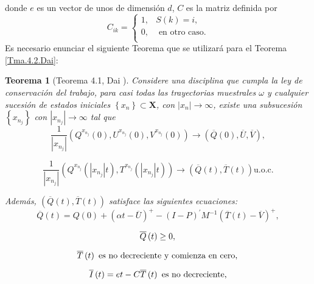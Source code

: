 \documentclass{article}
\newtheorem{Teo}{Teorema}
\begin{document}
donde $e$ es un vector de unos de dimensi\'on $d$, $C$ es la
matriz definida por
\[C_{ik}=\left\{\begin{array}{cc}
1,& S\left(k\right)=i,\\
0,& \textrm{ en otro caso}.\\
\end{array}\right.
\]
Es necesario enunciar el siguiente Teorema que se utilizar\'a para
el Teorema \ref{Tma.4.2.Dai}:
\begin{Teo}[Teorema 4.1, Dai \cite{Dai}]
Considere una disciplina que cumpla la ley de conservaci\'on del
trabajo, para casi todas las trayectorias muestrales $\omega$ y
cualquier sucesi\'on de estados iniciales
$\left\{x_{n}\right\}\subset \mathbf{X}$, con
$|x_{n}|\rightarrow\infty$, existe una subsucesi\'on
$\left\{x_{n_{j}}\right\}$ con $|x_{n_{j}}|\rightarrow\infty$ tal
que
\begin{equation}\label{Eq.4.15}
\frac{1}{|x_{n_{j}}|}\left(Q^{x_{n_{j}}}\left(0\right),U^{x_{n_{j}}}\left(0\right),V^{x_{n_{j}}}\left(0\right)\right)\rightarrow\left(\overline{Q}\left(0\right),\overline{U},\overline{V}\right),
\end{equation}

\begin{equation}\label{Eq.4.16}
\frac{1}{|x_{n_{j}}|}\left(Q^{x_{n_{j}}}\left(|x_{n_{j}}|t\right),T^{x_{n_{j}}}\left(|x_{n_{j}}|t\right)\right)\rightarrow\left(\overline{Q}\left(t\right),\overline{T}\left(t\right)\right)\textrm{
u.o.c.}
\end{equation}

Adem\'as,
$\left(\overline{Q}\left(t\right),\overline{T}\left(t\right)\right)$
satisface las siguientes ecuaciones:
\begin{equation}\label{Eq.MF.1.3a}
\overline{Q}\left(t\right)=Q\left(0\right)+\left(\alpha
t-\overline{U}\right)^{+}-\left(I-P\right)^{'}M^{-1}\left(\overline{T}\left(t\right)-\overline{V}\right)^{+},
\end{equation}

\begin{equation}\label{Eq.MF.2.3a}
\overline{Q}\left(t\right)\geq0,\\
\end{equation}

\begin{equation}\label{Eq.MF.3.3a}
\overline{T}\left(t\right)\textrm{ es no decreciente y comienza en cero},\\
\end{equation}

\begin{equation}\label{Eq.MF.4.3a}
\overline{I}\left(t\right)=et-C\overline{T}\left(t\right)\textrm{
es no decreciente,}\\
\end{equation}


\end{Teo}
\end{document}
